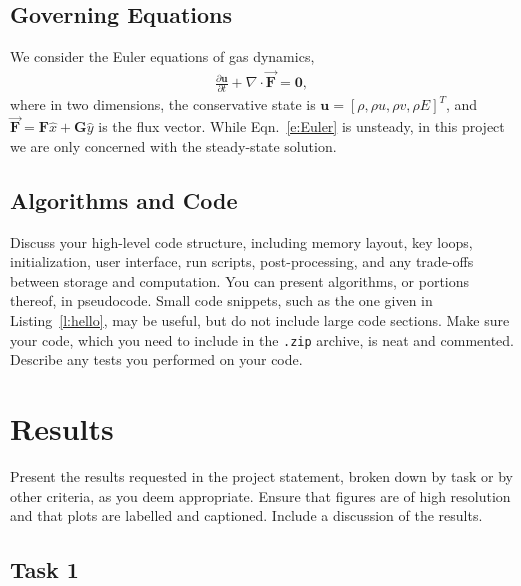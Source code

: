 \documentclass[11pt, twocolumn]{article}
\newcommand{\be}{\begin{eqnarray}}
\newcommand{\ee}{\end{eqnarray}}
\newcommand{\mbf}{\mathbf}
\newcommand{\mbfv}[1]{\vec{\mathbf{#1}}}
\newcommand{\pp}[2]{\frac{\partial #1}{\partial #2}}
\begin{document}
\subsection{Governing Equations}

We consider the Euler equations of gas dynamics, 
%
\be
\label{e:Euler}
\pp{\mbf{u}}{t} + \nabla \cdot \mbfv{F} = \mbf{0},
\ee
%
where in two dimensions, the conservative state is $\mbf{u} = [\rho,
  \rho u, \rho v, \rho E]^T$, and $\mbfv{F} = \mbf{F} \hat{x} +
\mbf{G} \hat{y}$ is the flux vector. While Eqn.~\ref{e:Euler} is
unsteady, in this project we are only concerned with the steady-state
solution.



\subsection{Algorithms and Code }

Discuss your high-level code structure, including memory layout, key
loops, initialization, user interface, run scripts, post-processing,
and any trade-offs between storage and computation.  You can present
algorithms, or portions thereof, in pseudocode.  Small code snippets,
such as the one given in Listing~\ref{l:hello}, may be useful, but do
not include large code sections.  Make sure your code, which you need
to include in the \texttt{.zip} archive, is neat and commented.
Describe any tests you performed on your code.






\section{Results}

Present the results requested in the project statement, broken down by
task or by other criteria, as you deem appropriate.  Ensure that
figures are of high resolution and that plots are labelled and
captioned.  Include a discussion of the results.

\subsection{Task 1}
\end{document}
